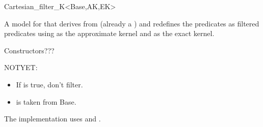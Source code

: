 \begin{ccRefClass}{Cartesian_filter_K<Base,AK,EK>}

\ccDefinition
A model for  that derives from  (already a
) and redefines the predicates as filtered predicates
using  as the approximate kernel and  as the exact
kernel.

\ccIsModel
{}

Constructors???

NOTYET:
\begin{itemize}
  \item If  is true, don't filter.
  \item {} is taken from Base.
\end{itemize}

\ccImplementation
The implementation uses  and
.

\end{ccRefClass}
